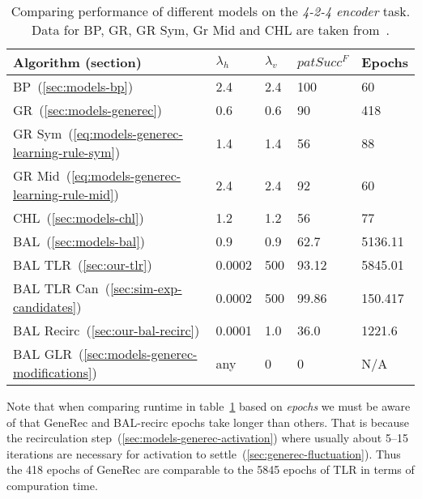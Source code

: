 \begin{table}[H] 
  \centering
    \begin{tabular}{|l|l|l|l|l|}
    \hline
    Algorithm (section)&$\lambda_h$&$\lambda_v$&$patSucc^F$ &Epochs\\ %
    \hline
    BP~(\ref{sec:models-bp}) &2.4 &2.4 &100&60\\ %
    \hline
    GR~(\ref{sec:models-generec}) &0.6 &0.6 &90&418\\ %
    \hline
    GR Sym~(\ref{eq:models-generec-learning-rule-sym}) &1.4 &1.4 &56&88\\ %
    \hline
    GR Mid~(\ref{eq:models-generec-learning-rule-mid}) &2.4 &2.4 &92&60\\ %
    \hline
    CHL~(\ref{sec:models-chl}) &1.2 &1.2 &56&77\\ %
    \hline
    BAL~(\ref{sec:models-bal})&0.9 &0.9 &62.7& 5136.11\\ %
    \hline
    BAL TLR~(\ref{sec:our-tlr})&0.0002  & 500&93.12&5845.01\\ %
    \hline
    BAL TLR Can~(\ref{sec:sim-exp-candidates})&0.0002&500&99.86&150.417\\ %
    \hline
    BAL Recirc~(\ref{sec:our-bal-recirc})&0.0001&1.0&36.0&1221.6\\ %
    \hline
    BAL GLR~(\ref{sec:models-generec-modifications})& any & 0 & 0 & N/A \\ 
    \hline 
    \end{tabular}
  \caption{Comparing performance of different models on the \emph{4-2-4 encoder} task. Data for BP, GR, GR Sym, Gr Mid and CHL are taken from~\citet{o1996bio}.} 
  \label{tab:results-cmp-auto4}
\end{table}

Note that when comparing runtime in table~\ref{tab:results-cmp-auto4} based on \emph{epochs} we must be aware of that GeneRec and BAL-recirc epochs take longer than others. That is because the recirculation step~(\ref{sec:models-generec-activation}) where usually about 5--15 iterations are necessary for activation to settle~(\ref{sec:generec-fluctuation}). Thus the 418 epochs of GeneRec are comparable to the 5845 epochs of TLR in terms of compuration time. 
